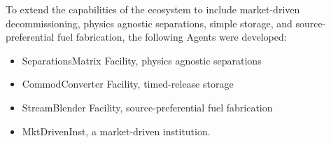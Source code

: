 
To extend the capabilities of the \Cyclus ecosystem to include market-driven 
decommissioning, physics agnostic separations, simple storage, and 
source-preferential fuel fabrication, the following Agents were developed:

\begin{itemize}
\item SeparationsMatrix Facility, physics agnostic separations
\item CommodConverter Facility, timed-release storage
\item StreamBlender Facility, source-preferential fuel fabrication 
\item MktDrivenInst, a market-driven institution.
\end{itemize}


